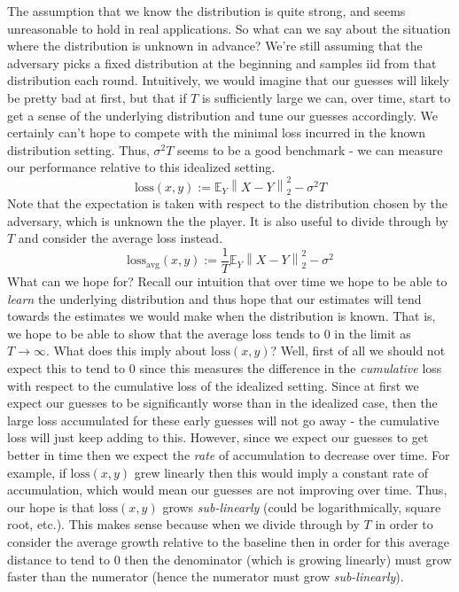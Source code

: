 \documentclass[12pt]{article}
\newcommand*{\norm}[1]{\left\lVert#1\right\rVert}
\newcommand{\E}{\mathbb{E}}
\begin{document}
The assumption that we know the distribution is quite strong, and seems unreasonable to hold in real applications. So what can we say about the situation where the distribution is unknown in advance?
We're still assuming that the adversary picks a fixed distribution at the beginning and samples iid from that distribution each round. Intuitively, we would imagine that our guesses will likely be pretty bad at first, 
but that if $T$ is sufficiently large we can, over time, start to get a sense of the underlying distribution and tune our guesses accordingly. We certainly can't hope to compete with the minimal loss incurred in the 
known distribution setting. Thus, $\sigma^2 T$ seems to be a good benchmark - we can measure our performance relative to this idealized setting. 
\[\text{loss}(x, y) := \E_Y \norm{X - Y}_2^2 - \sigma^2 T\]
Note that the expectation is taken with respect to the distribution chosen by the adversary, which is unknown the the player. 
It is also useful to divide through by $T$ and consider the average loss instead. 
\[\text{loss}_{\text{avg}}(x, y) := \frac{1}{T} \E_Y \norm{X - Y}_2^2 - \sigma^2\]
What can we hope for? Recall our intuition that over time we hope to be able to \textit{learn} the underlying distribution and thus hope that our estimates will tend towards the estimates we would make
when the distribution is known. That is, we hope to be able to show that the average loss tends to $0$ in the limit as $T \to \infty$. What does this imply about $\text{loss}(x, y)$? Well, first of all we should 
not expect this to tend to $0$ since this measures the difference in the \textit{cumulative} loss with respect to the cumulative loss of the idealized setting. Since at first we expect our guesses to be significantly
worse than in the idealized case, then the large loss accumulated for these early guesses will not go away - the cumulative loss will just keep adding to this. However, since we expect our guesses to get better
in time then we expect the \textit{rate} of accumulation to decrease over time. For example, if $\text{loss}(x, y)$ grew linearly then this would imply a constant rate of accumulation, which would mean our guesses
are not improving over time. Thus, our hope is that $\text{loss}(x, y)$ grows \textit{sub-linearly} (could be logarithmically, square root, etc.). This makes sense because when we divide through by $T$ in order 
to consider the average growth relative to the baseline then in order for this average distance to tend to $0$ then the denominator (which is growing linearly) must grow faster than the numerator (hence the 
numerator must grow \textit{sub-linearly}). 
\end{document}
